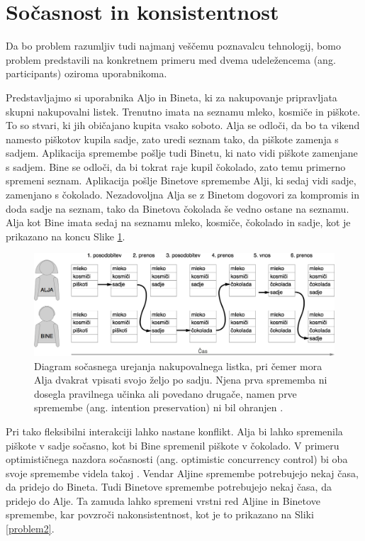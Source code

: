 \documentclass[a4paper, 12pt, twoside]{book}
\begin{document}
\section{Sočasnost in konsistentnost}
\label{sec:con}

Da bo problem razumljiv tudi najmanj veščemu poznavalcu tehnologij, bomo problem predstavili na konkretnem primeru \cite{problem} med dvema udeležencema (ang. participants) oziroma uporabnikoma.

Predstavljajmo si uporabnika Aljo in Bineta, ki za nakupovanje pripravljata skupni nakupovalni listek. Trenutno imata na seznamu mleko, kosmiče in piškote. To so stvari, ki jih običajano kupita vsako soboto. Alja se odloči, da bo ta vikend namesto piškotov kupila sadje, zato uredi seznam tako, da piškote zamenja s sadjem. Aplikacija spremembe pošlje tudi Binetu, ki nato vidi piškote zamenjane s sadjem. Bine se odloči, da bi tokrat raje kupil čokolado, zato temu primerno spremeni seznam. Aplikacija pošlje Binetove spremembe Alji, ki sedaj vidi sadje, zamenjano s čokolado. Nezadovoljna Alja se z Binetom dogovori za kompromis in doda sadje na seznam, tako da Binetova čokolada še vedno ostane na seznamu. Alja kot Bine imata sedaj na seznamu mleko, kosmiče, čokolado in sadje, kot je prikazano na koncu Slike \ref{problem1}.

\pagebreak

\begin{figure}[placement h]
\begin{center}
\includegraphics[width=16cm]{problem1.png}
\end{center}
\caption{Diagram sočasnega urejanja nakupovalnega listka, pri čemer mora Alja dvakrat vpisati svojo željo po sadju. Njena prva sprememba ni dosegla pravilnega učinka ali povedano drugače, namen prve spremembe (ang. intention preservation) ni bil ohranjen \cite{sigce}.}
\label{problem1}
\end{figure}

Pri tako fleksibilni interakciji lahko nastane konflikt. Alja bi lahko spremenila piškote v sadje sočasno, kot bi Bine spremenil piškote v čokolado. V primeru optimističnega nazdora sočasnosti (ang. optimistic concurrency control) bi oba svoje spremembe videla takoj \cite{hllbw}. Vendar Aljine spremembe potrebujejo nekaj časa, da pridejo do Bineta. Tudi Binetove spremembe potrebujejo nekaj časa, da pridejo do Alje. Ta zamuda lahko spremeni vrstni red Aljine in Binetove spremembe, kar povzroči nakonsistentnost, kot je to prikazano na Sliki \ref{problem2}.
\end{document}
